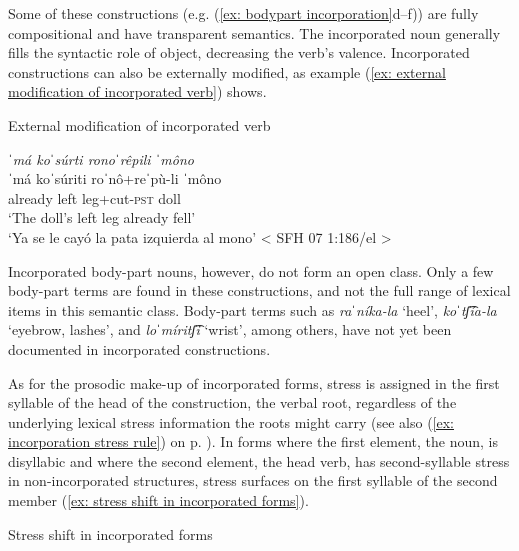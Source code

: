 Some of these constructions (e.g. (\ref{ex: bodypart  incorporation}d--f)) are fully compositional and have transparent semantics. The incorporated noun generally fills the syntactic role of object, decreasing the verb’s valence. Incorporated constructions can also be externally modified, as example (\ref{ex: external modification of incorporated verb}) shows.

\ea\label{ex: external modification of incorporated verb}
{External modification of incorporated verb}

{\textit{ˈmá  koˈsúrti    ronoˈrêpili  ˈmôno}}\\
\gll    ˈmá   koˈsúriti  roˈnô+reˈpù-li  ˈmôno\\
        already    left    leg+cut-\textsc{pst}  doll\\
\glt    ‘The doll’s left leg already fell’\\
\glt    ‘Ya se le cayó la pata izquierda al mono’        < SFH 07 1:186/el >\\
\z

Incorporated body-part nouns, however, do not form an open class. Only a few body-part terms are found in these constructions, and not the full range of lexical items in this semantic class. Body-part terms such as \textit{raˈníka-la} ‘heel’, \textit{koˈtʃ͡ía-la} ‘eyebrow, lashes’, and \textit{loˈmíritʃ͡i} ‘wrist’, among others, have not yet been documented in incorporated constructions.

As for the prosodic make-up of incorporated forms, stress is assigned in the first syllable of the head of the construction, the verbal root, regardless of the underlying lexical stress information the roots might carry (see also (\ref{ex: incorporation stress rule}) on p. \pageref{ex: incorporation stress rule}). In forms where the first element, the noun, is disyllabic and where the second element, the head verb, has second-syllable stress in non-incorporated structures, stress surfaces on the first syllable of the second member (\ref{ex: stress shift in incorporated forms}).

\ea\label{ex: stress shift in incorporated forms}
{Stress shift in incorporated forms}

